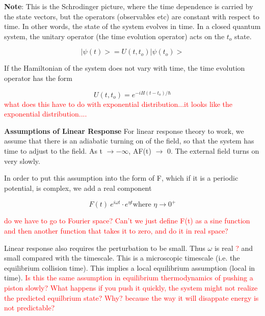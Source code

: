 \documentclass{article}
\begin{document}
\textbf{Note}: This is the Schrodinger picture, where the time dependence is carried by the state vectors,  but the operators (observables etc) are constant with respect to time. In other words, the state of the system evolves in time. In a closed quantum system, the unitary operator (the time evolution operator) acts on the $t_o$ state. 

\begin{equation}
\vert \psi(t)> = U(t,t_o)\vert \psi (t_o)>
\end{equation}

If the Hamiltonian of the system does not vary with time, the time evolution operator has the form

\begin{equation}
U(t,t_o)=e^{-iH(t-t_o)/\hbar}
\end{equation}
\textcolor{red}{what does this have to do with exponential distribution...it looks like the exponential distribution....}

\vspace{5mm}
\textbf{Assumptions of Linear Response}
For linear response theory to work, we assume that there is an adiabatic turning on of the field, so that the system has time to adjust to the field. As t $\rightarrow -\infty$,  AF(t) $\rightarrow$ 0. The external field turns on very slowly.

In order to put this assumption into the form of F, which if it is a periodic potential, is complex, we add a real component

\begin{equation}
F(t) ~ e^{i\omega t}\cdot e^{\eta t} \text{where } \eta \rightarrow 0^+
\end{equation}

\textcolor{red}{do we have to go to Fourier space? Can't we just define F(t) as a sine function and then another function that takes it to zero, and do it in real space?}

\vspace{5mm}

Linear response also requires the perturbation to be small. Thus $\omega$ is real \textcolor{red}{?} and small compared with the timescale. This is a microscopic timescale (i.e. the equilibrium collision time). This implies a local equilibrium assumption (local in time). \textcolor{red}{Is this the same assumption in equilibrium thermodynamics of pushing a piston slowly? What happens if you push it quickly, the system might not realize the predicted equilbrium state? Why? because the way it will disappate energy is not predictable?}
\end{document}
